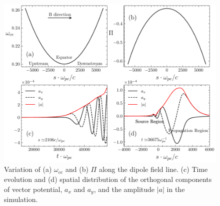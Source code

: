 \begin{figure}
    \centering
    \includegraphics[scale=0.5]{img/aanda.pdf}
    \caption{Variation of (a) $\omega_{ce}$ and (b) $\Pi$ along the dipole field line.  (c) Time evolution and (d) spatial distribution of the orthogonal components of vector potential, $a_x$ and $a_y$, and the amplitude $|a|$ in the simulation.
    \label{fig.aanda}
    }
\end{figure}

